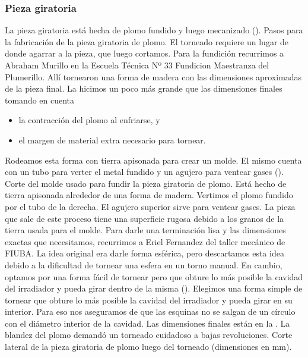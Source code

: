 \subsubsection{Pieza giratoria}
La pieza giratoria está hecha de plomo fundido y luego mecanizado
().
{Pasos para la fabricación de la pieza giratoria de plomo.
El torneado requiere un lugar de donde agarrar a la pieza,
que luego cortamos.}
Para la fundición recurrimos a Abraham Murillo en la 
Escuela Técnica Nº 33 Fundicion Maestranza del Plumerillo. 
Allí tornearon una forma de madera con las dimensiones aproximadas de la pieza final.
La hicimos un poco más grande que las dimensiones finales tomando en cuenta
\begin{itemize}
    \item la contracción del plomo al enfriarse, y
    \item el margen de material extra necesario para tornear.
\end{itemize}
Rodeamos esta forma con tierra apisonada para crear un molde.
El mismo cuenta con un tubo para verter el metal fundido 
y un agujero para ventear gases
().
{Corte del molde usado para fundir la pieza giratoria de plomo.
Está hecho de tierra apisonada alrededor de una forma de madera.
Vertimos el plomo fundido por el tubo de la derecha.
El agujero superior sirve para ventear gases.}
La pieza que sale de este proceso tiene una superficie rugosa
debido a los granos de la tierra usada para el molde.
Para darle una terminación lisa y las dimensiones exactas que necesitamos,
recurrimos a Eriel Fernandez del taller mecánico de FIUBA.
La idea original era darle forma esférica,
pero descartamos esta idea debido a la dificultad
de tornear una esfera en un torno manual.
En cambio, optamos por una forma fácil de tornear
pero que obture lo más posible la cavidad del irradiador 
y pueda girar dentro de la misma
().
{Elegimos una forma simple de tornear que obture lo más posible 
la cavidad del irradiador y pueda girar en su interior.
Para eso nos aseguramos de que las esquinas no se salgan de un círculo
con el diámetro interior de la cavidad.}
Las dimensiones finales están en la .
La blandez del plomo demandó un torneado cuidadoso a bajas revoluciones.
{Corte lateral de la pieza giratoria de plomo luego del torneado
(dimensiones en mm).}
